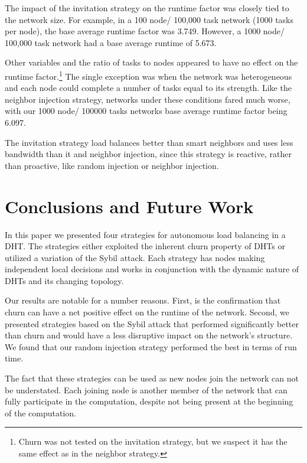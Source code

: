 \documentclass[10pt,conference]{IEEEtran}
\begin{document}
	
	
	The impact of the invitation strategy on the runtime factor was closely tied to the network size.
	For example, in a 100 node/ 100,000 task network (1000 tasks per node), the base average runtime factor was 3.749.
	However, a 1000 node/ 100,000 task network had a base average runtime of 5.673.
	
	Other variables and the ratio of tasks to nodes appeared to have no effect on the runtime factor.\footnote{Churn was not tested on the invitation strategy, but we suspect it has the same effect as in the neighbor strategy.}
	The single exception was when the network was heterogeneous and each node could complete a number of tasks equal to its strength.
	Like the neighbor injection strategy, networks under these conditions fared much worse, with our 1000 node/ 100000 tasks networks base average runtime factor being 6.097.
	
	The invitation strategy load balances better than smart neighbors and uses less bandwidth than it and neighbor injection, since this strategy is reactive, rather than proactive, like random injection or neighbor injection.
	
	\section{Conclusions and Future Work}
	In this paper we presented four strategies for autonomous load balancing in a DHT. 
	The strategies either exploited the inherent churn property of DHTs or utilized a variation of the Sybil attack. 
	Each strategy has nodes making independent local decisions and works in conjunction with the dynamic nature of DHTs and its changing topology.
	
	Our results are notable for a number reasons.
	First, is the confirmation that churn can have a net positive effect on the runtime of the network.
	Second, we presented strategies based on the Sybil attack that performed significantly better than churn and would have a less disruptive impact on the network's structure.
	We found that our random injection strategy performed the best in terms of run time.
	
	
	The fact that these strategies can be used as new nodes join the network can not be understated.
	Each joining node is another member of the network that can fully participate in the computation, despite not being present at the beginning of the computation.
	
\end{document}
